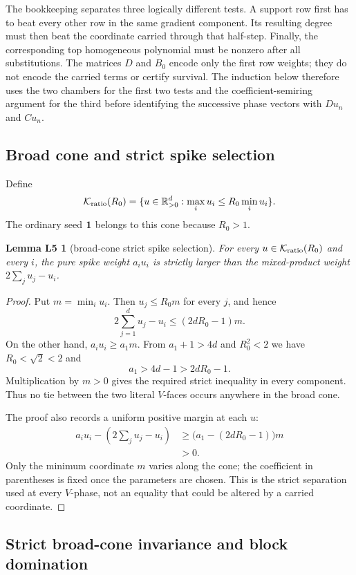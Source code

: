 \documentclass[11pt,letterpaper]{article}
\theoremstyle{plain}
\newtheorem*{lemLfive}{Lemma L5}
\begin{document}
The bookkeeping separates three logically different tests.  A support row first has to beat every other row in the same gradient component.  Its resulting degree must then beat the coordinate carried through that half-step.  Finally, the corresponding top homogeneous polynomial must be nonzero after all substitutions.  The matrices \(D\) and \(B_0\) encode only the first row weights; they do not encode the carried terms or certify survival.  The induction below therefore uses the two chambers for the first two tests and the coefficient-semiring argument for the third before identifying the successive phase vectors with \(Du_n\) and \(Cu_n\).

\subsection{Broad cone and strict spike selection}

Define
\[
\mathcal{K}_{\mathrm{ratio}}(R_0)=\{u\in\mathbb R_{>0}^d:\max_i u_i\leq R_0\min_i u_i\}.
\]
The ordinary seed $\mathbf{1}$ belongs to this cone because $R_0>1$.

\begin{lemLfive}[broad-cone strict spike selection]
For every $u\in\mathcal{K}_{\mathrm{ratio}}(R_0)$ and every $i$, the pure spike weight $a_i u_i$ is strictly larger than the mixed-product weight $2\sum_j u_j-u_i$.
\end{lemLfive}

\begin{proof}
Put $m=\min_i u_i$.  Then $u_j\leq R_0m$ for every $j$, and hence
\[
2\sum_{j=1}^d u_j-u_i\leq(2dR_0-1)m.
\]
On the other hand, $a_i u_i\geq a_1m$.  From $a_1+1>4d$ and $R_0^2<2$ we have $R_0<\sqrt2<2$ and
\[
a_1>4d-1>2dR_0-1.
\]
Multiplication by $m>0$ gives the required strict inequality in every component.  Thus no tie between the two literal $V$-faces occurs anywhere in the broad cone.

The proof also records a uniform positive margin at each $u$:
\[
\begin{aligned}
a_i u_i-\left(2\sum_j u_j-u_i\right)
&\geq
\bigl(a_1-(2dR_0-1)\bigr)m\\
&>0.
\end{aligned}
\]
Only the minimum coordinate $m$ varies along the cone; the coefficient in parentheses is fixed once the parameters are chosen.  This is the strict separation used at every $V$-phase, not an equality that could be altered by a carried coordinate.
\end{proof}

\subsection{Strict broad-cone invariance and block domination}
\end{document}
